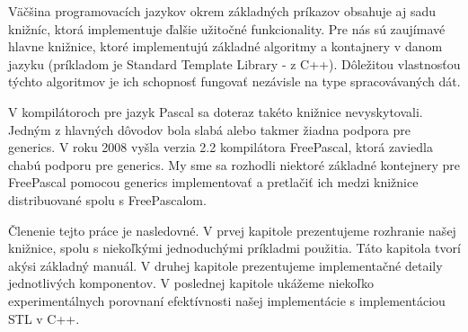 Väčšina programovacích jazykov okrem základných príkazov obsahuje aj sadu knižníc,
ktorá implementuje ďalšie užitočné funkcionality. Pre nás sú zaujímavé hlavne knižnice, ktoré
implementujú základné algoritmy a kontajnery v danom jazyku (príkladom je Standard Template
Library - \cite{STL} z C++). Dôležitou vlastnosťou týchto algoritmov je ich schopnosť
fungovať nezávisle na type spracovávaných dát.

V kompilátoroch pre jazyk Pascal sa doteraz takéto knižnice nevyskytovali.
Jedným z hlavných dôvodov bola slabá alebo takmer žiadna podpora pre generics.
V roku 2008 vyšla verzia 2.2 kompilátora FreePascal, ktorá zaviedla chabú podporu pre
generics. My sme sa rozhodli niektoré základné kontejnery pre FreePascal pomocou
generics implementovať a pretlačiť ich medzi knižnice distribuované spolu s FreePascalom.

Členenie tejto práce je nasledovné. V prvej kapitole prezentujeme rozhranie
našej knižnice, spolu s niekoľkými jednoduchými príkladmi použitia. Táto
kapitola tvorí akýsi základný manuál. V druhej kapitole prezentujeme implementačné
detaily jednotlivých komponentov. 
V poslednej kapitole ukážeme niekoľko experimentálnych porovnaní efektívnosti
našej implementácie s implementáciou STL v C++.
